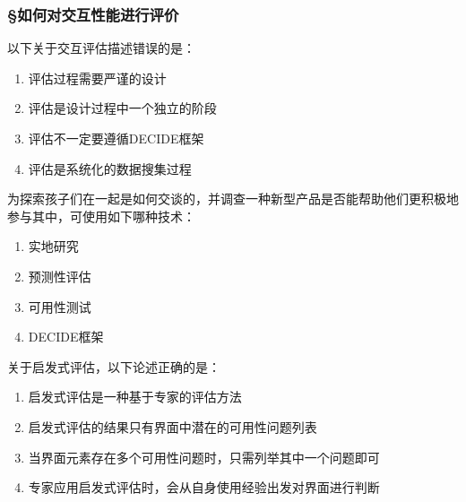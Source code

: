 \subsubsection*{\S 如何对交互性能进行评价}
\setcounter{problemname}{0}

\begin{problem}
	‍以下关于交互评估描述错误的是：
    \vspace{-0.8em}
    \begin{multicols}{2}
        \begin{enumerate}[label=\Alph*.]
            \item 评估过程需要严谨的设计
            \item 评估是设计过程中一个独立的阶段
            \item 评估不一定要遵循DECIDE框架
            \item 评估是系统化的数据搜集过程
        \end{enumerate}
    \end{multicols}
    \vspace{-1em}
\end{problem}



\begin{problem}
	‍为探索孩子们在一起是如何交谈的，并调查一种新型产品是否能帮助他们更积极地参与其中，可使用如下哪种技术：
    \vspace{-0.8em}
    \begin{multicols}{4}
        \begin{enumerate}[label=\Alph*.]
            \item 实地研究
            \item 预测性评估
            \item 可用性测试
            \item DECIDE框架
        \end{enumerate}
    \end{multicols}
    \vspace{-1em}
\end{problem}



\begin{problem}
	‍关于启发式评估，以下论述正确的是：
        \begin{enumerate}[label=\Alph*.]
            \item 启发式评估是一种基于专家的评估方法
            \item 启发式评估的结果只有界面中潜在的可用性问题列表
            \item 当界面元素存在多个可用性问题时，只需列举其中一个问题即可
            \item 专家应用启发式评估时，会从自身使用经验出发对界面进行判断
        \end{enumerate}
\end{problem}



